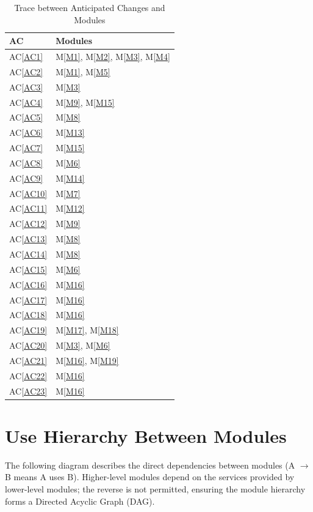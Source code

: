 \documentclass[12pt, titlepage]{article}
\newcommand{\acref}[1]{AC\ref{#1}}
\newcommand{\mref}[1]{M\ref{#1}}
\begin{document}
\begin{table}[H]
\centering
\caption{Trace between Anticipated Changes and Modules}
\begin{tabular}{p{} p{}}
\toprule
\textbf{AC} & \textbf{Modules}\\
\midrule
\acref{AC1} &  \mref{M1},  \mref{M2},  \mref{M3},  \mref{M4}\\
\acref{AC2} &  \mref{M1},  \mref{M5}\\
\acref{AC3} &  \mref{M3}\\
\acref{AC4} &  \mref{M9},  \mref{M15}\\
\acref{AC5} &  \mref{M8}\\
\acref{AC6} &  \mref{M13}\\
\acref{AC7} &  \mref{M15}\\
\acref{AC8} &  \mref{M6}\\
\acref{AC9} &  \mref{M14}\\
\acref{AC10} &  \mref{M7}\\
\acref{AC11} &  \mref{M12}\\
\acref{AC12} &  \mref{M9}\\
\acref{AC13} &  \mref{M8}\\
\acref{AC14} &  \mref{M8}\\
\acref{AC15} &  \mref{M6}\\
\acref{AC16} &  \mref{M16}\\
\acref{AC17} &  \mref{M16}\\
\acref{AC18} &  \mref{M16}\\
\acref{AC19} &  \mref{M17}, \mref{M18}\\
\acref{AC20} &  \mref{M3}, \mref{M6}\\
\acref{AC21} &  \mref{M16}, \mref{M19}\\
\acref{AC22} &  \mref{M16}\\
\acref{AC23} &  \mref{M16}\\
\bottomrule
\end{tabular}
\label{TblACT}
\end{table}

\section{Use Hierarchy Between Modules}\label{SecUse}

The following diagram describes the direct dependencies between modules
(A $\rightarrow$ B means A uses B). Higher-level modules depend on the services
provided by lower-level modules; the reverse is not permitted, ensuring the
module hierarchy forms a Directed Acyclic Graph (DAG).\\
\end{document}
